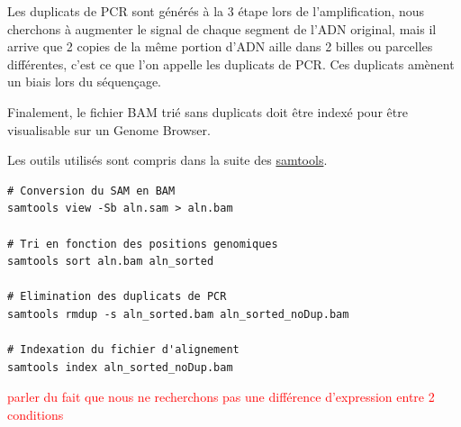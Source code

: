 \documentclass[12pt,a4paper]{report}
\begin{document}
\begin{onehalfspace}
Les duplicats de PCR sont générés à la 3\ieme{} étape lors de l'amplification, nous cherchons à augmenter le
signal de chaque segment de l'ADN original, mais il arrive que 2 copies de la même portion d'ADN
aille dans 2 billes ou parcelles différentes, c'est ce que l'on appelle les duplicats de PCR. Ces duplicats
amènent un biais lors du séquençage.

Finalement, le fichier BAM trié sans duplicats doit être indexé pour être visualisable sur un Genome Browser.

Les outils utilisés sont compris dans la suite des \href{http://samtools.sourceforge.net/samtools.shtml}{samtools}.
\lstset{language=sh}  
\begin{lstlisting}[frame=single]
# Conversion du SAM en BAM
samtools view -Sb aln.sam > aln.bam

# Tri en fonction des positions genomiques
samtools sort aln.bam aln_sorted

# Elimination des duplicats de PCR
samtools rmdup -s aln_sorted.bam aln_sorted_noDup.bam

# Indexation du fichier d'alignement
samtools index aln_sorted_noDup.bam
\end{lstlisting}

\textcolor{red}{parler du fait que nous ne recherchons pas une différence d'expression entre 2 conditions}

\end{onehalfspace}


 
\printglossary[type=\acronymtype ,title=Glossaire]


%

\end{document}

